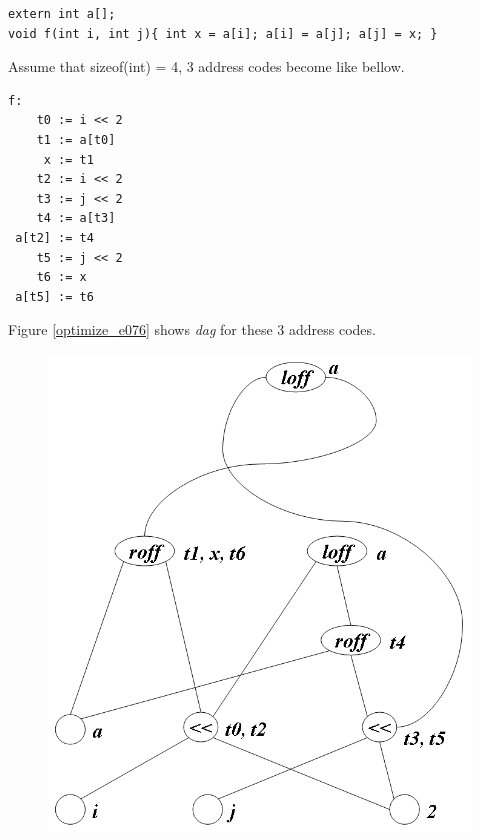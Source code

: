 \begin{Example}
\begin{verbatim}
extern int a[];
void f(int i, int j){ int x = a[i]; a[i] = a[j]; a[j] =	x; }
\end{verbatim}
Assume that sizeof(int) = 4, 3 address codes become like bellow.
\begin{verbatim}
f:
    t0 := i << 2
    t1 := a[t0]
     x := t1
    t2 := i << 2
    t3 := j << 2
    t4 := a[t3]
 a[t2] := t4
    t5 := j << 2
    t6 := x
 a[t5] := t6
\end{verbatim}
Figure \ref{optimize_e076} shows {\em dag} for these 3 address codes.
\begin{figure}[htbp]
\begin{center}
\begin{htmlonly}
\includegraphics[width=1.0\linewidth,height=1.069\linewidth]{opt031.png}
\end{htmlonly}
\begin{latexonly}

\end{latexonly}
\end{center}
\end{figure}
\end{Example}
